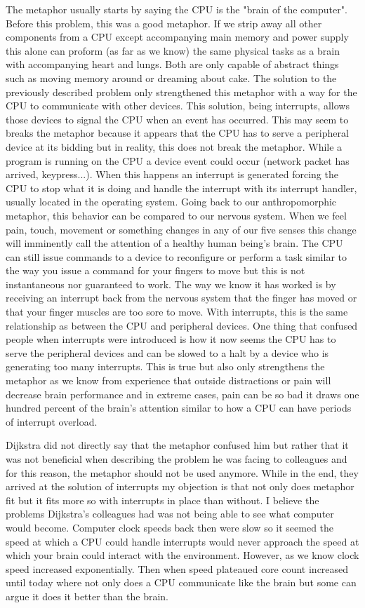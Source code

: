 \documentclass{article}
\begin{document}
The metaphor usually starts by saying the CPU is the "brain of the computer". Before this problem, this was a good metaphor. If we strip away all other components from a CPU except accompanying main memory and power supply this alone can proform (as far as we know) the same physical tasks as a brain with accompanying heart and lungs. Both are only capable of abstract things such as moving memory around or dreaming about cake. The solution to the previously described problem only strengthened this metaphor with a way for the CPU to communicate with other devices. This solution, being interrupts, allows those devices to signal the CPU when an event has occurred. This may seem to breaks the metaphor because it appears that the CPU has to serve a peripheral device at its bidding but in reality, this does not break the metaphor. While a program is running on the CPU a device event could occur (network packet has arrived, keypress...). When this happens an interrupt is generated forcing the CPU to stop what it is doing and handle the interrupt with its interrupt handler, usually located in the operating system. Going back to our anthropomorphic metaphor, this behavior can be compared to our nervous system. When we feel pain, touch, movement or something changes in any of our five senses this change will imminently call the attention of a healthy human being's brain. The CPU can still issue commands to a device to reconfigure or perform a task similar to the way you issue a command for your fingers to move but this is not instantaneous nor guaranteed to work. The way we know it has worked is by receiving an interrupt back from the nervous system that the finger has moved or that your finger muscles are too sore to move. With interrupts, this is the same relationship as between the CPU and peripheral devices. One thing that confused people when interrupts were introduced is how it now seems the CPU has to serve the peripheral devices and can be slowed to a halt by a device who is generating too many interrupts. This is true but also only strengthens the metaphor as we know from experience that outside distractions or pain will decrease brain performance and in extreme cases, pain can be so bad it draws one hundred percent of the brain's attention similar to how a CPU can have periods of interrupt overload.

Dijkstra did not directly say that the metaphor confused him but rather that it was not beneficial when describing the problem he was facing to colleagues and for this reason, the metaphor should not be used anymore. While in the end, they arrived at the solution of interrupts my objection is that not only does metaphor fit but it fits more so with interrupts in place than without. I believe the problems Dijkstra's colleagues had was not being able to see what computer would become. Computer clock speeds back then were slow so it seemed the speed at which a CPU could handle interrupts would never approach the speed at which your brain could interact with the environment. However, as we know clock speed increased exponentially. Then when speed plateaued core count increased until today where not only does a CPU communicate like the brain but some can argue it does it better than the brain.

\printbibliography
\end{document}
